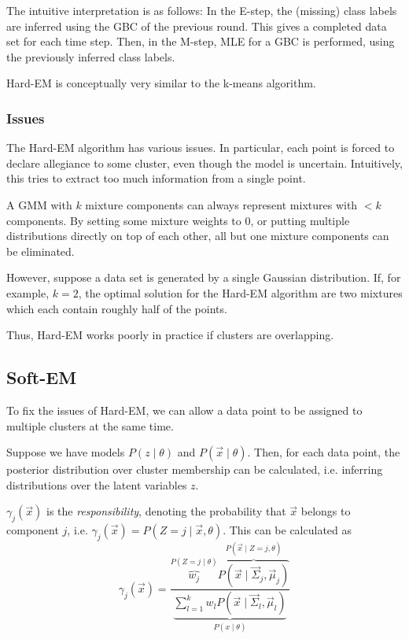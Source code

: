 The intuitive interpretation is as follows:
In the E-step, the (missing) class labels are inferred
using the GBC of the previous round.
This gives a completed data set for each time step.
Then, in the M-step, MLE for a GBC is performed,
using the previously inferred class labels.

Hard-EM is conceptually very similar to the k-means algorithm.

\subsubsection{Issues}
The Hard-EM algorithm has various issues.
In particular, each point is forced to
declare allegiance to some cluster,
even though the model is uncertain.
Intuitively, this tries to extract too much
information from a single point.

A GMM with $k$ mixture components can always
represent mixtures with $< k$ components.
By setting some mixture weights to $0$,
or putting multiple distributions directly
on top of each other,
all but one mixture components can be eliminated.

However, suppose a data set is generated by a single
Gaussian distribution.
If, for example, $k=2$, the optimal solution for
the Hard-EM algorithm are two mixtures which each
contain roughly half of the points.

Thus, Hard-EM works poorly in practice if clusters
are overlapping.


\subsection{Soft-EM}
To fix the issues of Hard-EM,
we can allow a data point to be assigned to multiple clusters
at the same time.

Suppose we have models $P(z \mid \theta)$ and 
$P(\vec{x} \mid \theta)$.
Then, for each data point, the posterior distribution over
cluster membership can be calculated,
i.e. inferring distributions over the latent variables $z$.

$\gamma_j(\vec{x})$ is the \emph{responsibility},
denoting the probability that $\vec{x}$ belongs to component $j$,
i.e. $\gamma_j(\vec{x}) = P(Z = j \mid \vec{x}, \theta)$.
This can be calculated as
\begin{equation*}
\gamma_j(\vec{x}) = \frac{
	\overbrace{w_j}^{P(Z = j \mid \theta)}
	\overbrace{P(\vec{x} \mid \vec{\Sigma}_j, \vec{\mu}_j)}^{P(\vec{x} \mid Z = j, \theta)}
}{
	\underbrace{
		\sum_{l=1}^k{
			w_l P(\vec{x} \mid \vec{\Sigma}_l, \vec{\mu}_l)
		}
	}_{P(x \mid \theta)}
}
\end{equation*}

